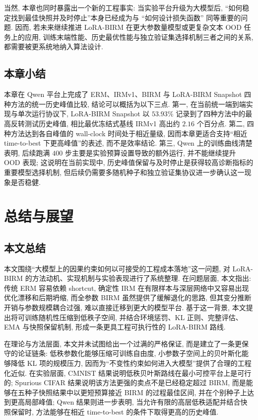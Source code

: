 \documentclass[a4paper,punct=banjiao,twoside]{ctexrep}
\theoremstyle{plain}
\theoremstyle{definition}
\theoremstyle{remark}
\begin{document}
当然, 本章也同时暴露出一个新的工程事实: 当实验平台升级为大模型后, ``如何稳定找到最佳快照并及时停止''本身已经成为与 ``如何设计损失函数'' 同等重要的问题. 因而, 若未来继续推进 LoRA-BIRM 在更大参数量模型或更复杂文本 OOD 任务上的应用, 训练末端性能、历史最优性能与独立验证集选择机制三者之间的关系, 都需要被更系统地纳入算法设计.

\section{本章小结}

本章在 Qwen 平台上完成了 ERM、IRMv1、BIRM 与 LoRA-BIRM Snapshot 四种方法的统一历史峰值比较, 结论可以概括为以下三点. 第一, 在当前统一端到端实现与单次运行协议下, LoRA-BIRM Snapshot 以 $53.93\%$ 记录到了四种方法中的最高反转测试历史峰值, 相比最优冻结式基线 IRMv1 高出约 $2.16$ 个百分点. 第二, 四种方法达到各自峰值的 wall-clock 时间处于相近量级, 因而本章更适合支持“相近 time-to-best 下更高峰值”的表述, 而不是效率结论. 第三, Qwen 上的训练曲线清楚表明, 后续跑满 $400$ 步主要是实验预算设置导致的额外运行, 并不能继续提升 OOD 表现; 这说明在当前实现中, 历史峰值保留与及时停止是获得较高诊断指标的重要模型选择机制, 但后续仍需要多随机种子和独立验证集协议进一步确认这一现象是否稳健.

\chapter{总结与展望}

\section{本文总结}

本文围绕“大模型上的因果约束如何以可接受的工程成本落地”这一问题, 对 LoRA-BIRM 的方法动机、实现机制与实验表现进行了系统整理. 在问题层面, 本文指出: 传统 ERM 容易依赖 shortcut, 确定性 IRM 在有限样本与深层网络中又容易出现优化漂移和后期坍缩, 而全参数 BIRM 虽然提供了缓解退化的思路, 但其变分推断开销与参数规模耦合过强, 难以直接迁移到更大的模型平台. 基于这一背景, 本文提出将可训练随机性压缩到低秩子空间, 并结合环境惩罚、KL 正则、完整评估、EMA 与快照保留机制, 形成一条更具工程可执行性的 LoRA-BIRM 路线.

在理论与方法层面, 本文并未试图给出一个过满的严格保证, 而是建立了一条更保守的论证链条: 低秩参数化能够压缩可训练自由度, 小参数子空间上的贝叶斯化能够降低 KL 项的规模压力, 因而为“不变性约束如何进入大模型”提供了合理的工程化近似. 在实验层面, CMNIST 结果说明低秩贝叶斯路线在最小可控平台上是可行的; Spurious CIFAR 结果说明该方法更强的卖点不是已经稳定超过 BIRM, 而是能够在五种子快照结果中以更短预算接近 BIRM 的过程最佳区间, 并在个别种子上达到更高局部峰值; Qwen 结果则进一步表明, 当允许有限的高层低秩适配并结合快照保留时, 方法能够在相近 time-to-best 的条件下取得更高的历史峰值.
\end{document}

